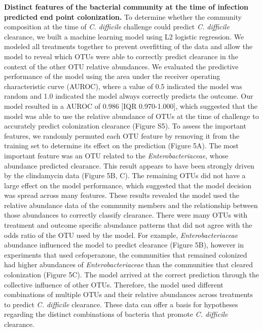 \documentclass[12pt,]{article}
\begin{document}
\textbf{Distinct features of the bacterial community at the time of
infection predicted end point colonization.} To determine whether the
community composition at the time of \emph{C. difficile} challenge could
predict \emph{C. difficile} clearance, we built a machine learning model
using L2 logistic regression. We modeled all treatments together to
prevent overfitting of the data and allow the model to reveal which OTUs
were able to correctly predict clearance in the context of the other OTU
relative abundances. We evaluated the predictive performance of the
model using the area under the receiver operating characteristic curve
(AUROC), where a value of 0.5 indicated the model was random and 1.0
indicated the model always correctly predicts the outcome. Our model
resulted in a AUROC of 0.986 {[}IQR 0.970-1.000{]}, which suggested that
the model was able to use the relative abundance of OTUs at the time of
challenge to accurately predict colonization clearance (Figure S5). To
assess the important features, we randomly permuted each OTU feature by
removing it from the training set to determine its effect on the
prediction (Figure 5A). The most important feature was an OTU related to
the \emph{Enterobacteriaceae}, whose abundance predicted clearance. This
result appears to have been strongly driven by the clindamycin data
(Figure 5B, C). The remaining OTUs did not have a large effect on the
model performance, which suggested that the model decision was spread
across many features. These results revealed the model used the relative
abundance data of the community members and the relationship between
those abundances to correctly classify clearance. There were many OTUs
with treatment and outcome specific abundance patterns that did not
agree with the odds ratio of the OTU used by the model. For example,
\emph{Enterobacteriaceae} abundance influenced the model to predict
clearance (Figure 5B), however in experiments that used cefoperazone,
the communities that remained colonized had higher abundances of
\emph{Enterobacteriaceae} than the communities that cleared colonization
(Figure 5C). The model arrived at the correct prediction through the
collective influence of other OTUs. Therefore, the model used different
combinations of multiple OTUs and their relative abundances across
treatments to predict \emph{C. difficile} clearance. These data can
offer a basis for hypotheses regarding the distinct combinations of
bacteria that promote \emph{C. difficile} clearance.
\end{document}
